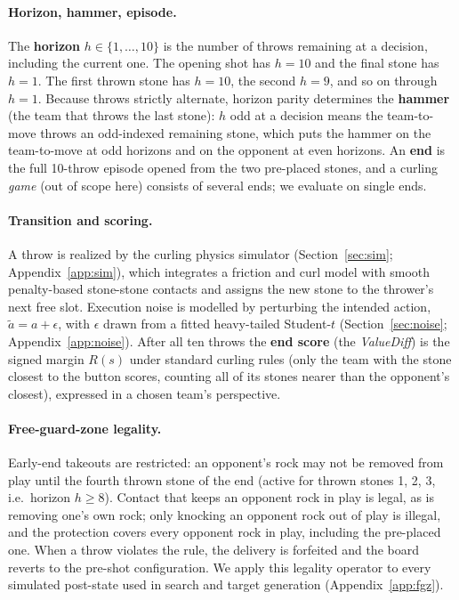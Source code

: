 \documentclass[11pt]{article}
\begin{document}
\paragraph{Horizon, hammer, episode.}
The \textbf{horizon} $h\in\{1,\ldots,10\}$ is the number of throws remaining
at a decision, including the current one. The opening shot has $h=10$ and
the final stone has $h=1$. The first thrown stone has $h=10$, the second
$h=9$, and so on through $h=1$. Because throws strictly alternate, horizon
parity determines the \textbf{hammer} (the team that throws the last stone):
$h$ odd at a decision means the team-to-move throws an odd-indexed remaining
stone, which puts the hammer on the team-to-move at odd horizons and on the
opponent at even horizons. An \textbf{end} is the full 10-throw episode
opened from the two pre-placed stones, and a curling \emph{game} (out of
scope here) consists of several ends; we evaluate on single ends.

\paragraph{Transition and scoring.}
A throw is realized by the curling physics simulator (Section~\ref{sec:sim};
Appendix~\ref{app:sim}), which integrates a friction and curl model with
smooth penalty-based stone-stone contacts and assigns the new stone to the
thrower's next free slot. Execution noise is modelled by perturbing the
intended action, $\tilde a = a+\epsilon$, with $\epsilon$ drawn from a fitted
heavy-tailed Student-$t$ (Section~\ref{sec:noise};
Appendix~\ref{app:noise}). After all ten throws the \textbf{end score} (the
\emph{ValueDiff}) is the signed margin $R(s)$ under standard curling rules
(only the team with the stone closest to the button scores, counting all of
its stones nearer than the opponent's closest), expressed in a chosen team's
perspective.

\paragraph{Free-guard-zone legality.}
Early-end takeouts are restricted: an opponent's rock may not be removed
from play until the fourth thrown stone of the end (active for thrown stones
1, 2, 3, i.e.\ horizon $h\ge 8$). Contact that keeps an opponent rock in
play is legal, as is removing one's own rock; only knocking an opponent
rock out of play is illegal, and the protection covers every opponent rock
in play, including the pre-placed one. When a throw violates the rule, the
delivery is forfeited and the board reverts to the pre-shot configuration.
We apply this legality operator to every simulated post-state used in search
and target generation (Appendix~\ref{app:fgz}).
\end{document}

